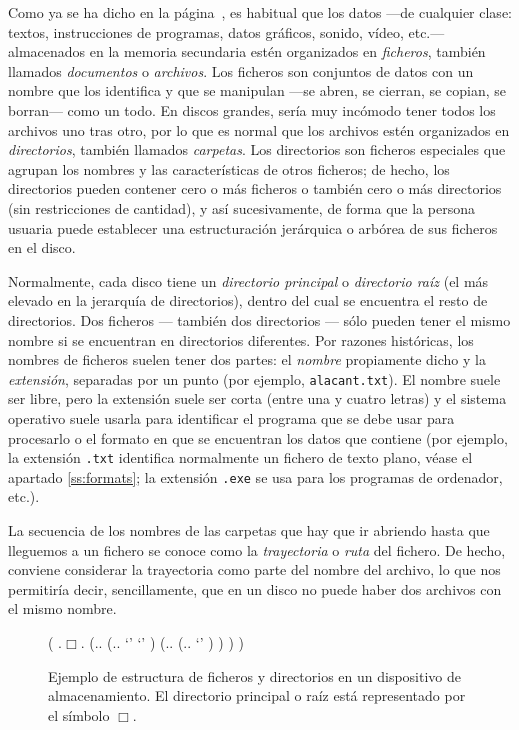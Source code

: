 Como ya se ha dicho en la página~\pageref{pg:menciofitxer}, es habitual que los datos ---de cualquier clase: textos, instrucciones de programas, datos gráficos, sonido, vídeo, etc.--- almacenados en la memoria secundaria estén organizados en {\em ficheros}, también llamados \emph{documentos} o \emph{archivos}. Los ficheros son conjuntos de datos con un nombre que los identifica y que se manipulan ---se abren, se cierran, se copian, se borran--- como un todo. En discos grandes, sería muy incómodo tener todos los archivos uno tras otro, por lo que es normal que los archivos estén organizados en {\em directorios}, también llamados \emph{carpetas}. Los directorios son ficheros especiales que agrupan los nombres y las características de otros ficheros; de hecho, los directorios pueden contener cero o más ficheros o también cero o más directorios (sin restricciones de cantidad), y así sucesivamente, de forma que la persona usuaria puede establecer una estructuración jerárquica o arbórea de sus ficheros en el disco. 

Normalmente, cada disco tiene un {\em directorio principal} o \emph{ directorio raíz} (el más elevado en la jerarquía de directorios), dentro del cual se encuentra el resto de directorios. Dos ficheros --- también dos directorios --- sólo pueden tener el mismo nombre si se encuentran en directorios diferentes. Por razones históricas, los nombres de ficheros suelen tener dos partes: el \emph{nombre} propiamente dicho y la \emph{extensión}, separadas por un punto (por ejemplo, \texttt{alacant.txt}). El nombre suele ser libre, pero la extensión suele ser corta (entre una y cuatro letras) y el sistema operativo suele usarla para identificar el programa que se debe usar para procesarlo o el formato en que se encuentran los datos que contiene (por ejemplo, la extensión \texttt{.txt} identifica normalmente un fichero de texto plano, véase el apartado \ref{ss:formats}; la extensión \texttt{.exe} se usa para los programas de ordenador, etc.). 

La secuencia de los nombres de las carpetas que hay que ir abriendo hasta que lleguemos a un fichero se conoce como la \emph{trayectoria} o \emph{ruta} del fichero. De hecho, conviene considerar la trayectoria como parte del nombre del archivo, lo que nos permitiría decir, sencillamente, que en un disco no puede haber dos archivos con el mismo nombre. 

\begin{figure} \centering

\begin{parsetree} ( .{$\Box$}. (.{}. (.{}. `' `' ) (.{}. (.{}. `' ) ) ) ) \end{parsetree} \caption{Ejemplo de estructura de ficheros y directorios en un dispositivo de almacenamiento. El directorio principal o raíz está representado por el símbolo $\Box$.}\label{fg:fitxersdirs} \end{figure} 

